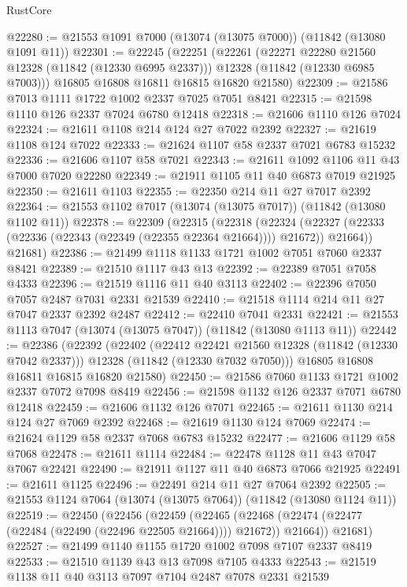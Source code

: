 \begin{lexlean}{RustCore}
\begin{coremodule}
@22280 := @21553 @1091 @7000 (@13074 (@13075 @7000)) (@11842 (@13080 @1091 @11))
@22301 := @22245
    (@22251
      (@22261
        (@22271 @22280 @21560 @12328 (@11842 (@12330 @6995 @2337)))
        @12328
        (@11842 (@12330 @6985 @7003)))
      @16805
      @16808
      @16811
      @16815
      @16820
      @21580)
@22309 := @21586 @7013 @1111 @1722 @1002 @2337 @7025 @7051 @8421
@22315 := @21598 @1110 @126 @2337 @7024 @6780 @12418
@22318 := @21606 @1110 @126 @7024
@22324 := @21611 @1108 @214 @124 @27 @7022 @2392
@22327 := @21619 @1108 @124 @7022
@22333 := @21624 @1107 @58 @2337 @7021 @6783 @15232
@22336 := @21606 @1107 @58 @7021
@22343 := @21611 @1092 @1106 @11 @43 @7000 @7020 @22280
@22349 := @21911 @1105 @11 @40 @6873 @7019 @21925
@22350 := @21611 @1103
@22355 := @22350 @214 @11 @27 @7017 @2392
@22364 := @21553 @1102 @7017 (@13074 (@13075 @7017)) (@11842 (@13080 @1102 @11))
@22378 := @22309
    (@22315
      (@22318
        (@22324 (@22327 (@22333 (@22336 (@22343 (@22349 (@22355 @22364 @21664)))) @21672)) @21664))
      @21681)
@22386 := @21499 @1118 @1133 @1721 @1002 @7051 @7060 @2337 @8421
@22389 := @21510 @1117 @43 @13
@22392 := @22389 @7051 @7058 @4333
@22396 := @21519 @1116 @11 @40 @3113
@22402 := @22396 @7050 @7057 @2487 @7031 @2331 @21539
@22410 := @21518 @1114 @214 @11 @27 @7047 @2337 @2392 @2487
@22412 := @22410 @7041 @2331
@22421 := @21553 @1113 @7047 (@13074 (@13075 @7047)) (@11842 (@13080 @1113 @11))
@22442 := @22386
    (@22392
      (@22402
        (@22412 @22421 @21560 @12328 (@11842 (@12330 @7042 @2337)))
        @12328
        (@11842 (@12330 @7032 @7050)))
      @16805
      @16808
      @16811
      @16815
      @16820
      @21580)
@22450 := @21586 @7060 @1133 @1721 @1002 @2337 @7072 @7098 @8419
@22456 := @21598 @1132 @126 @2337 @7071 @6780 @12418
@22459 := @21606 @1132 @126 @7071
@22465 := @21611 @1130 @214 @124 @27 @7069 @2392
@22468 := @21619 @1130 @124 @7069
@22474 := @21624 @1129 @58 @2337 @7068 @6783 @15232
@22477 := @21606 @1129 @58 @7068
@22478 := @21611 @1114
@22484 := @22478 @1128 @11 @43 @7047 @7067 @22421
@22490 := @21911 @1127 @11 @40 @6873 @7066 @21925
@22491 := @21611 @1125
@22496 := @22491 @214 @11 @27 @7064 @2392
@22505 := @21553 @1124 @7064 (@13074 (@13075 @7064)) (@11842 (@13080 @1124 @11))
@22519 := @22450
    (@22456
      (@22459
        (@22465 (@22468 (@22474 (@22477 (@22484 (@22490 (@22496 @22505 @21664)))) @21672)) @21664))
      @21681)
@22527 := @21499 @1140 @1155 @1720 @1002 @7098 @7107 @2337 @8419
@22533 := @21510 @1139 @43 @13 @7098 @7105 @4333
@22543 := @21519 @1138 @11 @40 @3113 @7097 @7104 @2487 @7078 @2331 @21539

\end{coremodule}
\end{lexlean}
